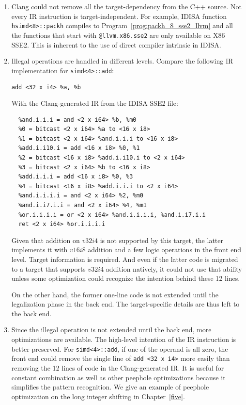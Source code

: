 \begin{enumerate}
    \item Clang could not remove all the target-dependency from the C++ source. Not every IR instruction is target-independent. For example, IDISA function {\tt hsimd<8>::packh} compiles to Program~\ref{prog:packh_8_sse2_llvm} and all the functions that start with {\tt @llvm.x86.sse2} are only available on X86 SSE2. This is inherent to the use of direct compiler intrinsic in IDISA.
    \newpage

    \item Illegal operations are handled in different levels. Compare the following IR implementation for {\tt simd<4>::add}:
      \begin{center}
        \verb|add <32 x i4> %a, %b|
      \end{center}
    With the Clang-generated IR from the IDISA SSE2 file:
      \begin{center}
        \begin{verbatim}
  %and.i.i.i = and <2 x i64> %b, %m0
  %0 = bitcast <2 x i64> %a to <16 x i8>
  %1 = bitcast <2 x i64> %and.i.i.i to <16 x i8>
  %add.i.i10.i = add <16 x i8> %0, %1
  %2 = bitcast <16 x i8> %add.i.i10.i to <2 x i64>
  %3 = bitcast <2 x i64> %b to <16 x i8>
  %add.i.i.i = add <16 x i8> %0, %3
  %4 = bitcast <16 x i8> %add.i.i.i to <2 x i64>
  %and.i.i.i.i = and <2 x i64> %2, %m0
  %and.i.i7.i.i = and <2 x i64> %4, %m1
  %or.i.i.i.i = or <2 x i64> %and.i.i.i.i, %and.i.i7.i.i
  ret <2 x i64> %or.i.i.i.i
        \end{verbatim}
      \end{center}

    Given that addition on $v32i4$ is not supported by this target, the latter implements it with $v16i8$ addition and a few logic operations in the front end level. Target information is required. And even if the latter code is migrated to a target that supports $v32i4$ addition natively, it could not use that ability unless some optimization could recognize the intention behind these 12 lines.

    On the other hand, the former one-line code is not extended until the legalization phase in the back end. The target-specific details are thus left to the back end.

    \item Since the illegal operation is not extended until the back end, more optimizations are available. The high-level intention of the IR instruction is better preserved. For {\tt simd<4>::add}, if one of the operand is all zero, the front end could remove the single line of \verb|add <32 x i4>| more easily than removing the 12 lines of code in the Clang-generated IR\@. It is useful for constant combination as well as other peephole optimizations because it simplifies the pattern recognition. We give an example of peephole optimization on the long integer shifting in Chapter~\ref{five}.
\end{enumerate}

